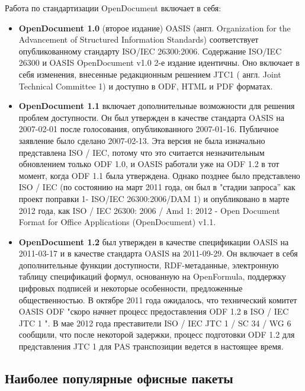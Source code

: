 Работа по стандартизации OpenDocument включает в себя:
\begin{itemize}
  \item \textbf{OpenDocument 1.0} (второе издание) OASIS (англ. Organization for the Advancement of Structured Information Standards) соответствует опубликованному стандарту ISO/IEC 26300:2006. Содержание ISO/IEC 26300 и OASIS OpenDocument v1.0 2-е издание идентичны. Оно включает в себя изменения, внесенные редакционным решением JTC1 ( англ. Joint Technical Committee 1) и доступно в ODF, HTML и PDF форматах.
  \item \textbf{OpenDocument 1.1} включает дополнительные возможности для решения проблем доступности. Он был утвержден в качестве стандарта OASIS на 2007-02-01 после голосования, опубликованного 2007-01-16. Публичное заявление было сделано 2007-02-13. Эта версия не была изначально представлена ISO / IEC, потому что это считается незначительным обновлением только ODF 1.0, и OASIS работали уже на ODF 1.2 в тот момент, когда ODF 1.1 была утверждена. Однако позднее было представлено ISO / IEC (по состоянию на март 2011 года, он был в "стадии запроса'' как проект поправки 1- ISO/IEC 26300:2006/DAM 1) и опубликовано в марте 2012 года, как ISO / IEC 26300: 2006 / Amd 1: 2012 - Open Document Format for Office Applications (OpenDocument) v1.1.
  \item  \textbf{OpenDocument 1.2} был утвержден в качестве спецификации OASIS на 2011-03-17 и в качестве стандарта OASIS на 2011-09-29. Он включает в себя дополнительные функции доступности, RDF-метаданные, электронную таблицу спецификаций формул, основанную на OpenFormula, поддержку цифровых подписей и некоторые особенности, предложенные общественностью. В октябре 2011 года ожидалось, что технический комитет OASIS ODF "скоро начнет процесс предоставления ODF 1.2 в ISO / IEC JTC 1 ". В мае 2012 года преставители ISO / IEC JTC 1 / SC 34 / WG 6 сообщили, что после некоторой задержки, процесс подготовки ODF 1.2 для представления JTC 1 для PAS транспозиции ведется в настоящее время.
\end{itemize} 
\subsection{Наиболее популярные офисные пакеты}


